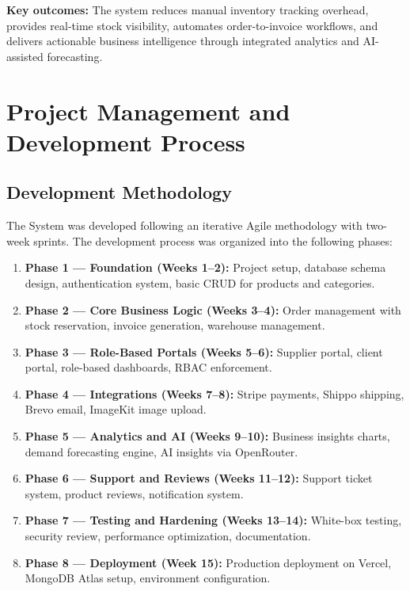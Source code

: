 \documentclass[12pt,a4paper]{report}
\begin{document}
\textbf{Key outcomes:} The system reduces manual inventory tracking overhead, provides real-time stock visibility, automates order-to-invoice workflows, and delivers actionable business intelligence through integrated analytics and AI-assisted forecasting.

\newpage

\tableofcontents
\newpage


\chapter{Project Management and Development Process}
\section{Development Methodology}

The System was developed following an iterative Agile methodology with two-week sprints. The development process was organized into the following phases:

\begin{enumerate}[leftmargin=1.5em]
  \item \textbf{Phase 1 --- Foundation (Weeks 1--2):} Project setup, database schema design, authentication system, basic CRUD for products and categories.
  \item \textbf{Phase 2 --- Core Business Logic (Weeks 3--4):} Order management with stock reservation, invoice generation, warehouse management.
  \item \textbf{Phase 3 --- Role-Based Portals (Weeks 5--6):} Supplier portal, client portal, role-based dashboards, RBAC enforcement.
  \item \textbf{Phase 4 --- Integrations (Weeks 7--8):} Stripe payments, Shippo shipping, Brevo email, ImageKit image upload.
  \item \textbf{Phase 5 --- Analytics and AI (Weeks 9--10):} Business insights charts, demand forecasting engine, AI insights via OpenRouter.
  \item \textbf{Phase 6 --- Support and Reviews (Weeks 11--12):} Support ticket system, product reviews, notification system.
  \item \textbf{Phase 7 --- Testing and Hardening (Weeks 13--14):} White-box testing, security review, performance optimization, documentation.
  \item \textbf{Phase 8 --- Deployment (Week 15):} Production deployment on Vercel, MongoDB Atlas setup, environment configuration.
\end{enumerate}
\end{document}
